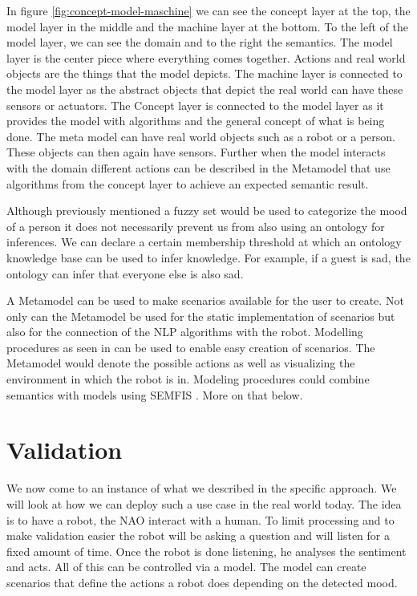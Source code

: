 \documentclass{lncs}
\begin{document}
In figure \ref{fig:concept-model-maschine} we can see the concept layer at the top, the model layer in the middle and the machine layer at the bottom. To the left of the model layer, we can see the domain and to the right the semantics. The model layer is the center piece where everything comes together. Actions and real world objects are the things that the model depicts. The machine layer is connected to the model layer as the abstract objects that depict the real world can have these sensors or actuators. The Concept layer is connected to the model layer as it provides the model with algorithms and the general concept of what is being done. The meta model can have real world objects such as a robot or a person. These objects can then again have sensors. Further when the model interacts with the domain different actions can be described in the Metamodel that use algorithms from the concept layer to achieve an expected semantic result.

Although previously mentioned a fuzzy set would be used to categorize the mood of a person it does not necessarily prevent us from also using an ontology for inferences. We can declare a certain membership threshold at which an ontology knowledge base can be used to infer knowledge. For example, if a guest is sad, the ontology can infer that everyone else is also sad.

A Metamodel can be used to make scenarios available for the user to create. Not only can the Metamodel be used for the static implementation of scenarios but also for the connection of the NLP algorithms with the robot. Modelling procedures as seen in \cite{cs3657} can be used to enable easy creation of scenarios. The Metamodel would denote the possible actions as well as visualizing the environment in which the robot is in. Modeling procedures could combine semantics with models using SEMFIS \cite{cs4933}. More on that below.

\section{Validation}\label{sec:Validation}

We now come to an instance of what we described in the specific approach. We will look at how we can deploy such a use case in the real world today. The idea is to have a robot, the NAO interact with a human. To limit processing and to make validation easier the robot will be asking a question and will listen for a fixed amount of time. Once the robot is done listening, he analyses the sentiment and acts. All of this can be controlled via a model. The model can create scenarios that define the actions a robot does depending on the detected mood.
\end{document}
